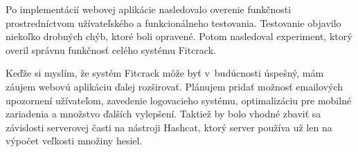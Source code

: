 \documentclass[slovak]{fitthesis}
\begin{document}
Po implementácií webovej aplikácie nasledovalo overenie funkčnosti prostredníctvom užívateľského a funkcionálneho testovania. Testovanie objavilo niekoľko drobných chýb, ktoré boli opravené. Potom nasledoval experiment, ktorý overil správnu funkčnosť celého systému Fitcrack.

Keďže si myslím, že systém Fitcrack môže byť v~budúcnosti úspešný, mám záujem webovú aplikáciu ďalej rozširovať. Plánujem pridať možnosť emailových upozornení užívateľom, zavedenie logovacieho systému, optimalizáciu pre mobilné zariadenia a množstvo ďalších vylepšení. Taktiež by bolo vhodné zbaviť sa závislosti serverovej časti na nástroji Hashcat, ktorý server používa už len na výpočet veľkosti množiny hesiel.


\ifslovak
  \makeatletter
  \def\@openbib@code{\addcontentsline{toc}{chapter}{Literatúra}}
  \makeatother
  
\else
  \ifczech
    \makeatletter
    \def\@openbib@code{\addcontentsline{toc}{chapter}{Literatura}}
    \makeatother
    
  \else 
    \makeatletter
    \def\@openbib@code{\addcontentsline{toc}{chapter}{Bibliography}}
    \makeatother
    
  \fi
\fi
  \begin{flushleft}
  
  \end{flushleft}

  \iftwoside
    \cleardoublepage
  \fi

  \appendix
\ifczech
  \renewcommand{\appendixpagename}{Přílohy}
  \renewcommand{\appendixtocname}{Přílohy}
  \renewcommand{\appendixname}{Příloha}
\fi
\ifslovak
  \renewcommand{\appendixpagename}{Prílohy}
  \renewcommand{\appendixtocname}{Prílohy}
  \renewcommand{\appendixname}{Príloha}
\fi

  
\ifslovak
\else
  \ifczech
  \else
  \fi
\fi
  \startcontents[chapters]
  \setlength{\parskip}{0pt}
  
\end{document}
